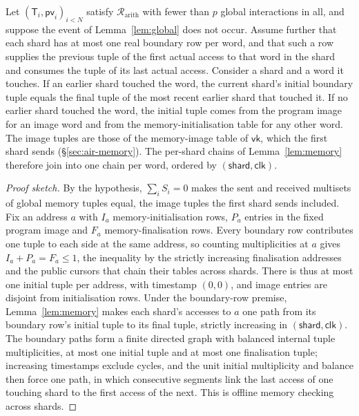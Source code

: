 \begin{lemma}
\label{lem:xmem}
Let $(\mathsf{T}_i, \mathsf{pv}_i)_{i<N}$ satisfy $\mathcal R_{\mathrm{arith}}$ with fewer than $p$ global interactions in all, and suppose the event of Lemma~\ref{lem:global} does not occur. Assume further that each shard has at most one real boundary row per word, and that such a row supplies the previous tuple of the first actual access to that word in the shard and consumes the tuple of its last actual access. Consider a shard and a word it touches. If an earlier shard touched the word, the current shard's initial boundary tuple equals the final tuple of the most recent earlier shard that touched it. If no earlier shard touched the word, the initial tuple comes from the program image for an image word and from the memory-initialisation table for any other word. The image tuples are those of the memory-image table of $\mathsf{vk}$, which the first shard sends (\S\ref{sec:air-memory}). The per-shard chains of Lemma~\ref{lem:memory} therefore join into one chain per word, ordered by $(\mathsf{shard}, \mathsf{clk})$.
\end{lemma}
\begin{proof}[Proof sketch]
By the hypothesis, $\sum_i S_i = 0$ makes the sent and received multisets of global memory tuples equal, the image tuples the first shard sends included. Fix an address $a$ with $I_a$ memory-initialisation rows, $P_a$ entries in the fixed program image and $F_a$ memory-finalisation rows. Every boundary row contributes one tuple to each side at the same address, so counting multiplicities at $a$ gives $I_a + P_a = F_a \le 1$, the inequality by the strictly increasing finalisation addresses and the public cursors that chain their tables across shards. There is thus at most one initial tuple per address, with timestamp $(0,0)$, and image entries are disjoint from initialisation rows. Under the boundary-row premise, Lemma~\ref{lem:memory} makes each shard's accesses to $a$ one path from its boundary row's initial tuple to its final tuple, strictly increasing in $(\mathsf{shard},\mathsf{clk})$. The boundary paths form a finite directed graph with balanced internal tuple multiplicities, at most one initial tuple and at most one finalisation tuple; increasing timestamps exclude cycles, and the unit initial multiplicity and balance then force one path, in which consecutive segments link the last access of one touching shard to the first access of the next. This is offline memory checking~\citep{blum1994} across shards.
\end{proof}

